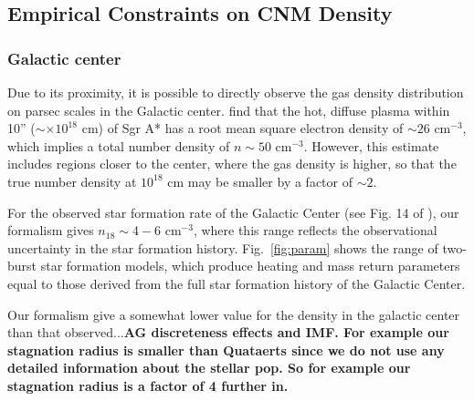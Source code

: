 \documentclass[usenatbib,fleqn]{mnras}
\newcommand{\Msun}{{\rm M_\odot}}
\begin{document}

\subsection{Empirical Constraints on CNM Density}
\label{sec:empirical}

\subsubsection{Galactic center} 
Due to its proximity, it is possible to directly observe the gas
density distribution on parsec scales in the Galactic
center. \citet{Baganoff+2003} find that the hot, diffuse plasma within
10'' ($\sim \times 10^{18}$ cm) of Sgr A* has a root mean square
electron density of $\sim 26$ cm$^{-3}$, which implies a total number
density of $n\sim 50$ cm$^{-3}$. However, this estimate
includes regions closer to the center, where the gas density is
higher, so that the true number density at $10^{18}$ cm may be smaller
by a factor of $\sim 2$.

For the observed star formation rate of the Galactic Center (see
Fig. 14 of \citealt{Pfuhl+2015}), our formalism gives $n_{18}\sim 4-6$
cm$^{-3}$, where this range reflects the observational uncertainty in
the star formation history. Fig.~\ref{fig:param} shows the range
of two-burst star formation models, which produce heating and mass
return parameters equal to those derived from the full star formation
history of the Galactic Center. 

Our formalism give a somewhat lower value for the density in the
galactic center than that observed...{\bf AG discreteness effects and
  IMF. For example our stagnation radius is smaller than Quataerts
  since we do not use any detailed information about the stellar
  pop. So for example our stagnation radius is a factor of 4 further in.}
\end{document}
